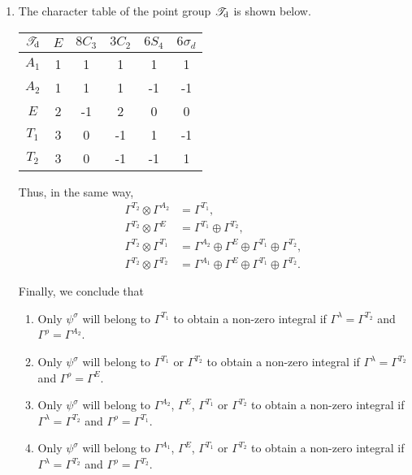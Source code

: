 \documentclass[a4paper]{book}
\begin{document}
\begin{solution}
\begin{enumerate}[label=(\alph*)]
		\item The character table of the point group $\mathscr{T}_{\rm d}$ is shown below.
		\begin{center}
		\begin{tabular}{cccccc}\hline
	$\mathscr{T}_{\rm d}$ & $E$ & $8C_3$ & $3C_2$ & $6S_4$ & $6\sigma_d$ \\ \hline
			$A_1$	&	1	&	1	&	1	&	1	&	1	\\
			$A_2$	&	1	&	1	&	1	&	-1	&	-1	\\
			$E$		&	2	&	-1	&	2	&	0	&	0	\\
			$T_1$	&	3	&	0	&	-1	&	1	&	-1	\\
			$T_2$	&	3	&	0	&	-1	&	-1	&	1\\ \hline
		\end{tabular}
		\end{center}
		Thus, in the same way,
		\begin{align}
			\Gamma^{T_2} \otimes \Gamma^{A_2} &= \Gamma^{T_1} , \\
			\Gamma^{T_2} \otimes \Gamma^{E} &= \Gamma^{T_1} \oplus \Gamma^{T_2} , \\
			\Gamma^{T_2} \otimes \Gamma^{T_1} &= \Gamma^{A_2} \oplus \Gamma^{E} \oplus \Gamma^{T_1} \oplus \Gamma^{T_2} , \\
			\Gamma^{T_2} \otimes \Gamma^{T_2} &= \Gamma^{A_1} \oplus \Gamma^{E} \oplus \Gamma^{T_1} \oplus \Gamma^{T_2} .
		\end{align}
		
		Finally, we conclude that 
			\begin{enumerate}[label=(\arabic*)]
			
			\item Only $\psi^\sigma$ will belong to $\Gamma^{T_1}$ to obtain a non-zero integral if $\Gamma^\lambda = \Gamma^{T_2}$ and $\Gamma^\rho = \Gamma^{A_2}$.
			
			\item Only $\psi^\sigma$ will belong to $\Gamma^{T_1}$ or $\Gamma^{T_2}$ to obtain a non-zero integral if $\Gamma^\lambda = \Gamma^{T_2}$ and $\Gamma^\rho = \Gamma^{E}$.
				
			\item Only $\psi^\sigma$ will belong to $\Gamma^{A_2}$, $\Gamma^E$, $\Gamma^{T_1}$ or $\Gamma^{T_2}$ to obtain a non-zero integral if $\Gamma^\lambda = \Gamma^{T_2}$ and $\Gamma^\rho = \Gamma^{T_1}$.
				
			\item Only $\psi^\sigma$ will belong to $\Gamma^{A_1}$, $\Gamma^E$, $\Gamma^{T_1}$ or $\Gamma^{T_2}$ to obtain a non-zero integral if $\Gamma^\lambda = \Gamma^{T_2}$ and $\Gamma^\rho = \Gamma^{T_2}$.
			
			\end{enumerate}					
		
		\end{enumerate}
	
	\end{solution}
\end{document}
